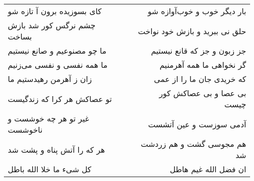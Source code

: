 \begin{center}
\begin{longtable}{l p{0.5cm} r}
کای بسوزیده برون آ تازه شو
&&
بار دیگر خوب و خوب‌آوازه شو
\\
چشم نرگس کور شد بازش بساخت
&&
حلق نی ببرید و بازش خود نواخت
\\
ما چو مصنوعیم و صانع نیستیم
&&
جز زبون و جز که قانع نیستیم
\\
ما همه نفسی و نفسی می‌زنیم
&&
گر نخواهی ما همه آهرمنیم
\\
زان ز آهرمن رهیدستیم ما
&&
که خریدی جان ما را از عمی
\\
تو عصاکش هر کرا که زندگیست
&&
بی عصا و بی عصاکش کور چیست
\\
غیر تو هر چه خوشست و ناخوشست
&&
آدمی سوزست و عین آتشست
\\
هر که را آتش پناه و پشت شد
&&
هم مجوسی گشت و هم زردشت شد
\\
کل شیء ما خلا الله باطل
&&
ان فضل الله غیم هاطل
\\
\end{longtable}
\end{center}
